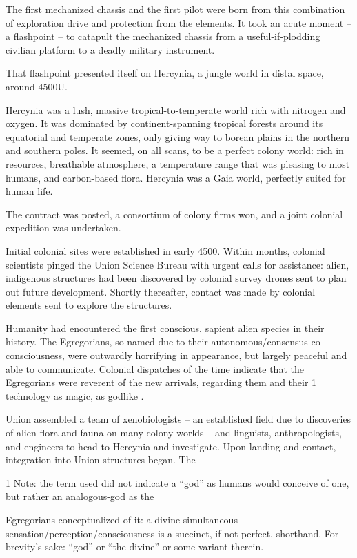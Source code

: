 The first mechanized chassis and the first pilot were born from this combination of exploration
drive and protection from the elements. It took an acute moment -- a flashpoint -- to catapult the
mechanized chassis from a useful-if-plodding civilian platform to a deadly military instrument.


That flashpoint presented itself on Hercynia, a jungle world in distal space, around 4500U.


Hercynia was a lush, massive tropical-to-temperate world rich with nitrogen and oxygen. It was
dominated by continent-spanning tropical forests around its equatorial and temperate zones,
only giving way to borean plains in the northern and southern poles. It seemed, on all scans, to
be a perfect colony world: rich in resources, breathable atmosphere, a temperature range that
was pleasing to most humans, and carbon-based flora. Hercynia was a Gaia world, perfectly
suited for human life.


The contract was posted, a consortium of colony firms won, and a joint colonial expedition was
undertaken.


Initial colonial sites were established in early 4500. Within months, colonial scientists pinged the
Union Science Bureau with urgent calls for assistance: alien, indigenous structures had been
discovered by colonial survey drones sent to plan out future development. Shortly thereafter,
contact was made by colonial elements sent to explore the structures.


Humanity had encountered the first conscious, sapient alien species in their history. The
Egregorians, so-named due to their autonomous/consensus co-consciousness, were outwardly
horrifying in appearance, but largely peaceful and able to communicate. Colonial dispatches of
the time indicate that the Egregorians were reverent of the new arrivals, regarding them and their
                                        1
technology as magic, as godlike  .

Union assembled a team of xenobiologists -- an established field due to discoveries of alien flora
and fauna on many colony worlds -- and linguists, anthropologists, and engineers to head to
Hercynia and investigate. Upon landing and contact, integration into Union structures began. The

1 Note: the term used did not indicate a “god” as humans would conceive of one, but rather an analogous-god as the

Egregorians conceptualized of it: a divine simultaneous sensation/perception/consciousness is a succinct, if not
perfect, shorthand. For brevity’s sake: “god” or “the divine” or some variant therein.




